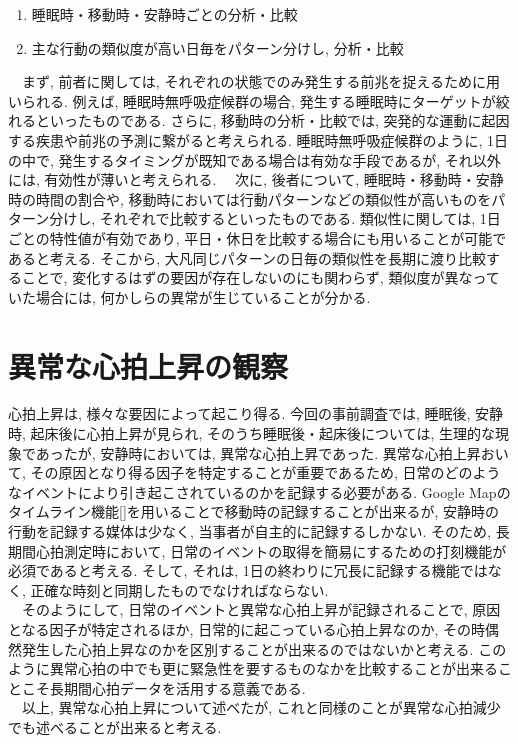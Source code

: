 \documentclass[report, 11pt, a4paper]{jsbook}
\begin{document}
\begin{enumerate}
  \item 睡眠時・移動時・安静時ごとの分析・比較
  \item 主な行動の類似度が高い日毎をパターン分けし, 分析・比較
\end{enumerate}

　まず, 前者に関しては, それぞれの状態でのみ発生する前兆を捉えるために用いられる. 例えば, 睡眠時無呼吸症候群の場合, 発生する睡眠時にターゲットが絞れるといったものである. さらに, 移動時の分析・比較では, 突発的な運動に起因する疾患や前兆の予測に繋がると考えられる. 睡眠時無呼吸症候群のように, 1日の中で, 発生するタイミングが既知である場合は有効な手段であるが, それ以外には, 有効性が薄いと考えられる.
　次に, 後者について, 睡眠時・移動時・安静時の時間の割合や, 移動時においては行動パターンなどの類似性が高いものをパターン分けし, それぞれで比較するといったものである. 類似性に関しては, 1日ごとの特性値が有効であり, 平日・休日を比較する場合にも用いることが可能であると考える. そこから, 大凡同じパターンの日毎の類似性を長期に渡り比較することで, 変化するはずの要因が存在しないのにも関わらず, 類似度が異なっていた場合には, 何かしらの異常が生じていることが分かる. 

\section{異常な心拍上昇の観察}
心拍上昇は, 様々な要因によって起こり得る. 今回の事前調査では, 睡眠後, 安静時, 起床後に心拍上昇が見られ, そのうち睡眠後・起床後については, 生理的な現象であったが, 安静時においては, 異常な心拍上昇であった. 異常な心拍上昇おいて, その原因となり得る因子を特定することが重要であるため, 日常のどのようなイベントにより引き起こされているのかを記録する必要がある. Google Mapのタイムライン機能[]を用いることで移動時の記録することが出来るが, 安静時の行動を記録する媒体は少なく, 当事者が自主的に記録するしかない. そのため, 長期間心拍測定時において, 日常のイベントの取得を簡易にするための打刻機能が必須であると考える. そして, それは, 1日の終わりに冗長に記録する機能ではなく, 正確な時刻と同期したものでなければならない.\\
　そのようにして, 日常のイベントと異常な心拍上昇が記録されることで, 原因となる因子が特定されるほか, 日常的に起こっている心拍上昇なのか, その時偶然発生した心拍上昇なのかを区別することが出来るのではないかと考える. このように異常心拍の中でも更に緊急性を要するものなかを比較することが出来ることこそ長期間心拍データを活用する意義である.\\
　以上, 異常な心拍上昇について述べたが, これと同様のことが異常な心拍減少でも述べることが出来ると考える. 
\end{document}
